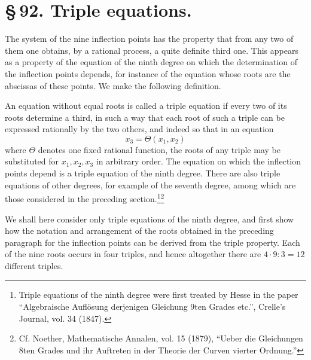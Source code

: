 \documentclass[11pt]{article}
\begin{document}
\section*{\S\,92. Triple equations.}

The system of the nine inflection points has the property that from any two of them one obtains, by a rational process, a quite definite third one. This appears as a property of the equation of the ninth degree on which the determination of the inflection points depends, for instance of the equation whose roots are the abscissas of these points. We make the following definition.

An equation without equal roots is called a triple equation if every two of its roots determine a third, in such a way that each root of such a triple can be expressed rationally by the two others, and indeed so that in an equation
\begin{equation}
 x_3=\Theta(x_1,x_2)
 \tag{1}
\end{equation}
where \(\Theta\) denotes one fixed rational function, the roots of any triple may be substituted for \(x_1,x_2,x_3\) in arbitrary order. The equation on which the inflection points depend is a triple equation of the ninth degree. There are also triple equations of other degrees, for example of the seventh degree, among which are those considered in the preceding section.\footnote{Triple equations of the ninth degree were first treated by Hesse in the paper ``Algebraische Auflösung derjenigen Gleichung 9ten Grades etc.'', Crelle's Journal, vol. 34 (1847).}\footnote{Cf. Noether, Mathematische Annalen, vol. 15 (1879), ``Ueber die Gleichungen 8ten Grades und ihr Auftreten in der Theorie der Curven vierter Ordnung.''}

We shall here consider only triple equations of the ninth degree, and first show how the notation and arrangement of the roots obtained in the preceding paragraph for the inflection points can be derived from the triple property. Each of the nine roots occurs in four triples, and hence altogether there are \(4\cdot 9:3=12\) different triples.
\end{document}
